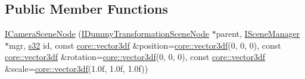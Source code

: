 \subsection*{Public Member Functions}
\begin{DoxyCompactItemize}
\item 
\hyperlink{classirr_1_1scene_1_1ICameraSceneNode_a77dabb4f8182c1389758c0736f9dff3d}{I\+Camera\+Scene\+Node} (\hyperlink{classirr_1_1scene_1_1IDummyTransformationSceneNode}{I\+Dummy\+Transformation\+Scene\+Node} $\ast$parent, \hyperlink{classirr_1_1scene_1_1ISceneManager}{I\+Scene\+Manager} $\ast$mgr, \hyperlink{namespaceirr_ac66849b7a6ed16e30ebede579f9b47c6}{s32} id, const \hyperlink{namespaceirr_1_1core_a06f169d08b5c429f5575acb7edbad811}{core\+::vector3df} \&position=\hyperlink{namespaceirr_1_1core_a06f169d08b5c429f5575acb7edbad811}{core\+::vector3df}(0, 0, 0), const \hyperlink{namespaceirr_1_1core_a06f169d08b5c429f5575acb7edbad811}{core\+::vector3df} \&rotation=\hyperlink{namespaceirr_1_1core_a06f169d08b5c429f5575acb7edbad811}{core\+::vector3df}(0, 0, 0), const \hyperlink{namespaceirr_1_1core_a06f169d08b5c429f5575acb7edbad811}{core\+::vector3df} \&scale=\hyperlink{namespaceirr_1_1core_a06f169d08b5c429f5575acb7edbad811}{core\+::vector3df}(1.\+0f, 1.\+0f, 1.\+0f))\hypertarget{classirr_1_1scene_1_1ICameraSceneNode_a77dabb4f8182c1389758c0736f9dff3d}{}\label{classirr_1_1scene_1_1ICameraSceneNode_a77dabb4f8182c1389758c0736f9dff3d}


\end{DoxyCompactItemize}
